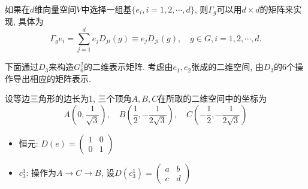 \documentclass[UTF8]{ctexart}
\begin{document}
如果在$d$维向量空间$V$中选择一组基$\{e_i, i = 1, 2, \cdots, d\}$, 则$\varGamma_g$可以用$d \times d$的矩阵来实现, 具体为
\begin{equation}
\varGamma_g e_i = \sum_{j = 1}^{d} e_j D_{ji} (g) \equiv e_j D_{ji}(g), \quad g \in G, i = 1,2, \cdots, d.
\end{equation}

下面通过$D_3$来构造$G_6^2$的二维表示矩阵. 考虑由$e_1, e_2$张成的二维空间, 由$D_3$的6个操作导出相应的矩阵表示.

设等边三角形的边长为1, 三个顶角$A, B, C$在所取的二维空间中的坐标为
\begin{equation}
A(0, \frac{1}{\sqrt{3}}), \quad B(\frac{1}{2}, -\frac{1}{2\sqrt{3}}), \quad C(-\frac{1}{2}, -\frac{1}{2\sqrt{3}})
\end{equation}

\begin{itemize}
\item 恒元: $D(e) =
  \begin{pmatrix}
    1 & 0 \\
    0 & 1
  \end{pmatrix}
$
\item $c_3^1$: 操作为$A\rightarrow C\rightarrow B$, 设$D(c_3^1) =
  \begin{pmatrix}
    a & b \\
    c & d
  \end{pmatrix}
$


\end{itemize}
\end{document}
